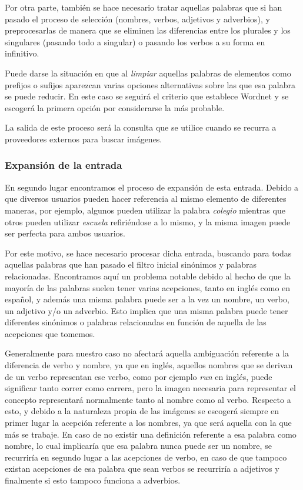 Por otra parte, también se hace necesario tratar aquellas palabras que si han pasado el proceso de selección (nombres, verbos, adjetivos y adverbios), y preprocesarlas de manera que se eliminen las diferencias entre los plurales y los singulares (pasando todo a singular) o pasando los verbos a su forma en infinitivo.

Puede darse la situación en que al \textit{limpiar} aquellas palabras de elementos como prefijos o sufijos aparezcan varias opciones alternativas sobre las que esa palabra se puede reducir. En este caso se seguirá el criterio que establece Wordnet y se escogerá la primera opción por considerarse la más probable.

La salida de este proceso será la consulta que se utilice cuando se recurra a proveedores externos para buscar imágenes.\\


\subsubsection{Expansión de la entrada}


En segundo lugar encontramos el proceso de expansión de esta entrada. Debido a que diversos usuarios pueden hacer referencia al mismo elemento de diferentes maneras, por ejemplo, algunos pueden utilizar la palabra \textit{colegio} mientras que otros pueden utilizar \textit{escuela} refiriéndose a lo mismo, y la misma imagen puede ser perfecta para ambos usuarios.

Por este motivo, se hace necesario procesar dicha entrada, buscando para todas aquellas palabras que han pasado el filtro inicial sinónimos y palabras relacionadas. Encontramos aquí un problema notable debido al hecho de que la mayoría de las palabras suelen tener varias acepciones, tanto en inglés como en español, y además una misma palabra puede ser a la vez un nombre, un verbo, un adjetivo y/o un adverbio. Esto implica que una misma palabra puede tener diferentes sinónimos o palabras relacionadas en función de aquella de las acepciones que tomemos.

Generalmente para nuestro caso no afectará aquella ambiguación referente a la diferencia de verbo y nombre, ya que en inglés, aquellos nombres que se derivan de un verbo representan ese verbo, como por ejemplo \textit{run} en inglés, puede significar tanto correr como carrera, pero la imagen necesaria para representar el concepto representará normalmente tanto al nombre como al verbo. Respecto a esto, y debido a la naturaleza propia de las imágenes se escogerá siempre en primer lugar la acepción referente a los nombres, ya que será aquella con la que más se trabaje. En caso de no existir una definición referente a esa palabra como nombre, lo cual implicaría que esa palabra nunca puede ser un nombre, se recurriría en segundo lugar a las acepciones de verbo, en caso de que tampoco existan acepciones de esa palabra que sean verbos se recurriría a adjetivos y finalmente si esto tampoco funciona a adverbios. 

